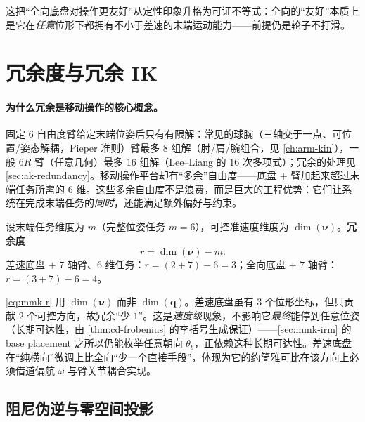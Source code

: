 \noindent 这把“全向底盘对操作更友好”从定性印象升格为可证不等式：全向的“友好”本质上是它在\emph{任意}位形下都拥有不小于差速的末端运动能力——前提仍是轮子不打滑。

\section{冗余度与冗余 IK}
\label{sec:mmk-redundancy}

\paragraph{为什么冗余是移动操作的核心概念。}
固定 $6$ 自由度臂给定末端位姿后只有有限解：常见的球腕（三轴交于一点、可位置/姿态解耦，Pieper 准则）臂最多 $8$ 组解（肘/肩/腕组合，见 \cref{ch:arm-kin}），一般 $6R$ 臂（任意几何）最多 $16$ 组解（Lee--Liang 的 $16$ 次多项式）；冗余的处理见 \cref{sec:ak-redundancy}。移动操作平台却有“多余”自由度——底盘 $+$ 臂加起来超过末端任务所需的 $6$ 维。这些多余自由度不是浪费，而是巨大的工程优势：它们让系统在完成末端任务的\emph{同时}，还能满足额外偏好与约束。

\begin{definition}[移动操作的冗余度]\label{def:mmk-redundancy}
设末端任务维度为 $m$（完整位姿任务 $m=6$），可控准速度维度为 $\dim(\boldsymbol{\nu})$。\textbf{冗余度}
\begin{equation}
  r=\dim(\boldsymbol{\nu})-m.
  \label{eq:mmk-r}
\end{equation}
差速底盘 $+$ $7$ 轴臂、$6$ 维任务：$r=(2+7)-6=3$；全向底盘 $+$ $7$ 轴臂：$r=(3+7)-6=4$。
\end{definition}

\begin{note}\label{note:mmk-r-quasivel}
\cref{eq:mmk-r} 用 $\dim(\boldsymbol{\nu})$ 而非 $\dim(\mathbf{q})$。差速底盘虽有 $3$ 个位形坐标，但只贡献 $2$ 个可控方向，故冗余“少 $1$”。这是\emph{速度级}现象，不影响它\emph{最终}能停到任意位姿（长期可达性，由 \cref{thm:cd-frobenius} 的李括号生成保证）——\cref{sec:mmk-irm} 的 base placement 之所以仍能枚举任意朝向 $\theta_b$，正依赖这种长期可达性。差速底盘在“纯横向”微调上比全向“少一个直接手段”，体现为它的约简雅可比在该方向上必须借道偏航 $\omega$ 与臂关节耦合实现。
\end{note}

\subsection{阻尼伪逆与零空间投影}
\label{sec:mmk-dls}

